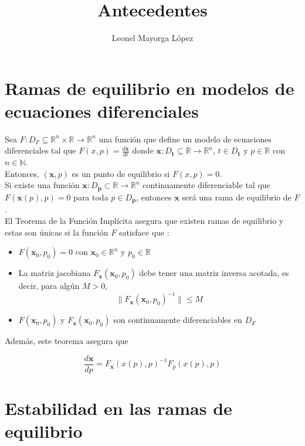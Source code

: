 \documentclass[10pt,a4paper]{article}
\author{Leonel Mayorga López}
\title{Antecedentes}
\begin{document}
\maketitle

\section{Ramas de equilibrio en modelos de ecuaciones diferenciales}

Sea \( F: D_{F} \subseteq \mathbb{R}^{n} \times \mathbb{R} \rightarrow \mathbb{R}^{n} \) una función que define un modelo de ecuaciones diferenciales tal que \( F(x,p) = \frac{d\mathbf{x}}{dt} \) donde \( \mathbf{x}: D_{\mathbf{t}} \subseteq \mathbb{R} \rightarrow \mathbb{R}^{n} \), \( t \in D_{\mathbf{t}} \) y \( p \in \mathbb{R} \) con \( n \in \mathbb{N} \).\\

Entonces, \((\mathbf{x}, p)\) es un punto de equilibrio si \( F(x,p) = 0 \).\\

Si existe una función \( \mathbf{x}: D_{\mathbf{p}} \subset \mathbb{R} \rightarrow \mathbb{R}^{n} \) continuamente diferenciable tal que \( F(\mathbf{x}(p), p) = 0 \) para toda \( p \in D_{\mathbf{p}} \), entonces \( \mathbf{x} \) será una rama de equilibrio de \( F \).\\

El Teorema de la Función Implícita asegura que existen ramas de equilibrio y estas son únicas si la función \( F \) satisface que \cite{Doedel}:

\begin{itemize}
    \item \( F(\mathbf{x}_{0}, p_{0}) = 0 \) con \( \mathbf{x}_{0} \in \mathbb{R}^{n} \) y \( p_{0} \in \mathbb{R} \)
    \item La matriz jacobiana \( F_{\mathbf{x}}(\mathbf{x}_{0}, p_{0}) \) debe tener una matriz inversa acotada, es decir, para algún \( M > 0 \),
    \[
    \| F_{\mathbf{x}}(\mathbf{x}_{0}, p_{0})^{-1} \| \leq M
    \]
    \item \( F(\mathbf{x}_{0}, p_{0}) \) y \( F_{\mathbf{x}}(\mathbf{x}_{0}, p_{0}) \) son continuamente diferenciables en \( D_{F} \)
\end{itemize}

Además, este teorema asegura que

\[
\dfrac{d\mathbf{x}}{dp} = F_{\mathbf{x}}(x(p), p)^{-1} F_{p}(x(p), p)
\]

\section{Estabilidad en las ramas de equilibrio}
\end{document}
